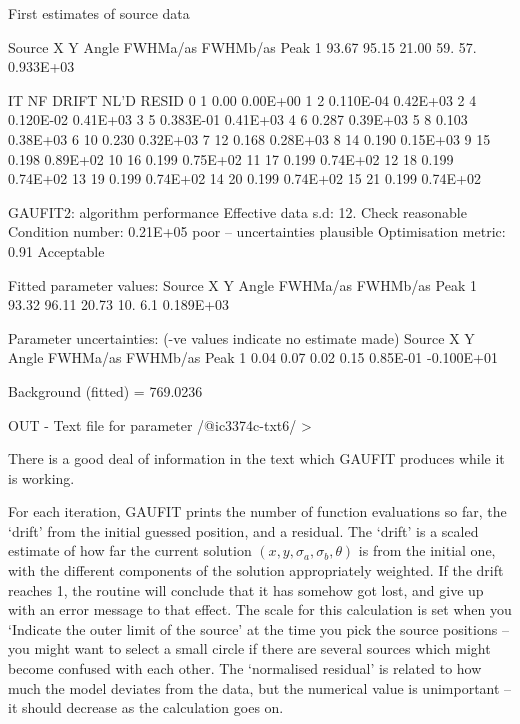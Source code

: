 \documentclass[twoside,11pt]{starlink}
\begin{document}
\begin{small}
\begin{terminalv}
First estimates of source data

Source      X           Y         Angle   FWHMa/as     FWHMb/as         Peak
  1       93.67       95.15       21.00     59.          57.        0.933E+03

   IT    NF     DRIFT    NL'D RESID
    0     1    0.00        0.00E+00
    1     2   0.110E-04    0.42E+03
    2     4   0.120E-02    0.41E+03
    3     5   0.383E-01    0.41E+03
    4     6   0.287        0.39E+03
    5     8   0.103        0.38E+03
    6    10   0.230        0.32E+03
    7    12   0.168        0.28E+03
    8    14   0.190        0.15E+03
    9    15   0.198        0.89E+02
   10    16   0.199        0.75E+02
   11    17   0.199        0.74E+02
   12    18   0.199        0.74E+02
   13    19   0.199        0.74E+02
   14    20   0.199        0.74E+02
   15    21   0.199        0.74E+02

GAUFIT2: algorithm performance
         Effective data s.d:     12.      Check reasonable
           Condition number:    0.21E+05  poor -- uncertainties plausible
        Optimisation metric:    0.91      Acceptable


Fitted parameter values:
Source      X           Y         Angle   FWHMa/as     FWHMb/as         Peak
  1       93.32       96.11       20.73     10.          6.1        0.189E+03

Parameter uncertainties: (-ve values indicate no estimate made)
Source      X           Y         Angle   FWHMa/as     FWHMb/as         Peak
  1        0.04        0.07        0.02    0.15         0.85E-01   -0.100E+01

Background (fitted) = 769.0236

OUT - Text file for parameter /@ic3374c-txt6/ >
\end{terminalv}
\end{small}

There is a good deal of information in the text which GAUFIT produces
while it is working.

For each iteration, GAUFIT prints the number of function evaluations
so far, the `drift' from the initial guessed position, and a
residual.  The `drift' is a scaled estimate of how far the current
solution $(x,y,\sigma_a,\sigma_b,\theta)$ is from the initial one,
with the different components of the solution appropriately weighted.
If the drift reaches 1, the routine will conclude that it has somehow
got lost, and give up with an error message to that effect. The scale
for this calculation is set when you `Indicate the outer limit of the
source' at the time you pick the source positions -- you might want to
select a small circle if there are several sources which might become
confused with each other.  The `normalised residual' is related to how
much the model deviates from the data, but the numerical value is
unimportant -- it should decrease as the calculation goes on.
\end{document}

